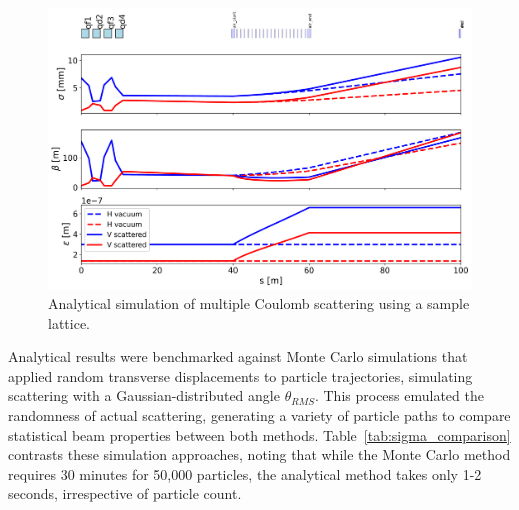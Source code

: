 \documentclass[a4paper,
               biblatex,     %
               ]{jacow}
\begin{document}
\begin{figure}[!htb]
   \centering
   \includegraphics*[width=1.0\columnwidth]{THPR032_f2.png}
   \caption{Analytical simulation of multiple Coulomb scattering using a sample lattice.}
   \label{fig:simple_line}
\end{figure}

Analytical results were benchmarked against Monte Carlo simulations that applied random transverse displacements to particle trajectories, simulating scattering with a Gaussian-distributed angle $\theta_{RMS}$. This process emulated the randomness of actual scattering, generating a variety of particle paths to compare statistical beam properties between both methods. Table~\ref{tab:sigma_comparison} contrasts these simulation approaches, noting that while the Monte Carlo method requires 30 minutes for 50,000 particles, the analytical method takes only 1-2 seconds, irrespective of particle count.

\begin{table}[ht]
\centering
\caption{Simulated beam size for analytical and Monte Carlo methods in non-scattered and scattered particle distributions.}

\label{tab:sigma_comparison}
\end{table}
\end{document}
